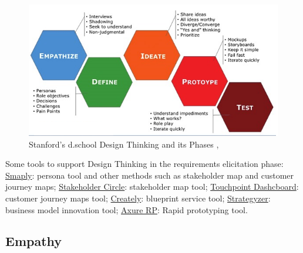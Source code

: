 \documentclass[conference]{IEEEtran}
\begin{document}
\begin{figure}[!htb]
    \centering
    \includegraphics[width=5.5in]{Figures/FigDR.png}
    \caption{Stanford’s d.school Design Thinking and its Phases \cite{DBLP:conf/hci/XimenesAA15},\cite{ DBLP:conf/icse/CarrollR16}}
    \label{fig:design_thinking_phases}
\end{figure}


Some tools to support Design Thinking in the requirements elicitation phase: \href{http://www.smaply.com}{Smaply}: persona tool and other methods such as stakeholder map and customer journey maps; \href{http://www.stakeholder-management.com/}{Stakeholder Circle}: stakeholder map tool; \href{http://www.touchpointdashboard.com}{Touchpoint Dashcboard}: customer journey maps tool; \href{http://www.creately.com}{Creately}: blueprint service tool; \href{http://www.strategyzer.com}{Strategyzer}: business model innovation tool; \href{http://www.axure.com/}{Axure RP}: Rapid prototyping tool.

\subsection{Empathy}
\end{document}
